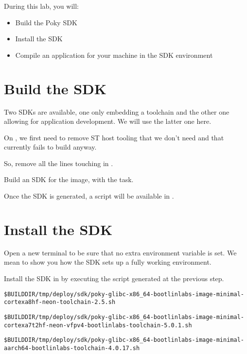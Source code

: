 
During this lab, you will:
\begin{itemize}
  \item Build the Poky SDK
  \item Install the SDK
  \item Compile an application for your machine in the SDK
    environment
\end{itemize}

\section{Build the SDK}

Two SDKs are available, one only embedding a toolchain and the
other one allowing for application development. We will use the latter one
here.

\if{}
On , we first need to remove ST host tooling that we
don't need and that currently fails to build anyway.

So, remove all the lines touching  in
.
\fi

Build an SDK for the  image, with
the  task.

Once the SDK is generated, a script will be available in
.

\section{Install the SDK}

Open a new terminal to be sure that no extra environment variable is set.
We mean to show you how the SDK sets up a fully working environment.

Install the SDK in  by executing the script
generated at the previous step.

{\footnotesize
\if{}
\begin{verbatim}
$BUILDDIR/tmp/deploy/sdk/poky-glibc-x86_64-bootlinlabs-image-minimal-cortexa8hf-neon-toolchain-2.5.sh
\end{verbatim}
\fi
\if{}
\begin{verbatim}
$BUILDDIR/tmp/deploy/sdk/poky-glibc-x86_64-bootlinlabs-image-minimal-cortexa7t2hf-neon-vfpv4-bootlinlabs-toolchain-5.0.1.sh
\end{verbatim}
\fi
\if{}
\begin{verbatim}
$BUILDDIR/tmp/deploy/sdk/poky-glibc-x86_64-bootlinlabs-image-minimal-aarch64-bootlinlabs-toolchain-4.0.17.sh
\end{verbatim}
\fi
}

